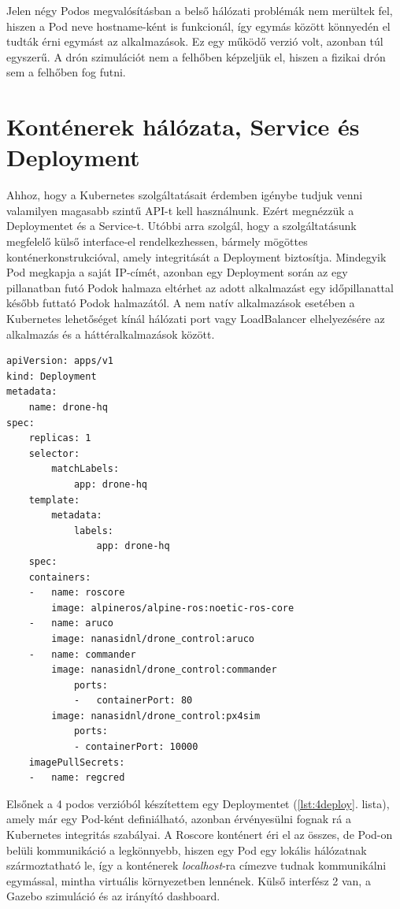 \noindent
Jelen négy Podos megvalósításban a belső hálózati problémák nem merültek fel, hiszen a Pod neve hostname-ként is funkcionál, így egymás között könnyedén el tudták érni egymást az alkalmazások. Ez egy működő verzió volt, azonban túl egyszerű. A drón szimulációt nem a felhőben képzeljük el, hiszen a fizikai drón sem a felhőben fog futni.

\section{Konténerek hálózata, Service és Deployment}

Ahhoz, hogy a Kubernetes szolgáltatásait érdemben igénybe tudjuk venni valamilyen magasabb szintű API-t kell használnunk. Ezért megnézzük a Deploymentet és a Service-t. Utóbbi arra szolgál, hogy a szolgáltatásunk megfelelő külső interface-el rendelkezhessen, bármely mögöttes konténerkonstrukcióval, amely integritását a Deployment biztosítja. Mindegyik Pod megkapja a saját IP-címét, azonban egy Deployment során az egy pillanatban futó Podok halmaza eltérhet az adott alkalmazást egy időpillanattal később futtató Podok halmazától. A nem natív alkalmazások esetében a Kubernetes lehetőséget kínál hálózati port vagy LoadBalancer elhelyezésére az alkalmazás és a háttéralkalmazások között. \cite{kservice} \\

\begin{minipage}{\linewidth}
\begin{lstlisting}[caption={Példa 4 konténeres deployment megoldásra},label={lst:4deploy}]
apiVersion: apps/v1
kind: Deployment
metadata:
	name: drone-hq
spec:
	replicas: 1
	selector:
		matchLabels:
			app: drone-hq
	template:
		metadata:
			labels:
				app: drone-hq
	spec:
	containers:
	-	name: roscore
		image: alpineros/alpine-ros:noetic-ros-core 
	-	name: aruco
		image: nanasidnl/drone_control:aruco
	- 	name: commander
		image: nanasidnl/drone_control:commander
			ports: 
			-	containerPort: 80
		image: nanasidnl/drone_control:px4sim
			ports: 
			- containerPort: 10000
	imagePullSecrets:
	-	name: regcred
\end{lstlisting}
\end{minipage}

\noindent
Elsőnek a 4 podos verzióból készítettem egy Deploymentet (\ref{lst:4deploy}. lista), amely már egy Pod-ként definiálható, azonban érvényesülni fognak rá a Kubernetes integritás szabályai. A Roscore konténert éri el az összes, de Pod-on belüli kommunikáció a legkönnyebb, hiszen egy Pod egy lokális hálózatnak szármoztatható le, így a konténerek \emph{localhost}-ra címezve tudnak kommunikálni egymással, mintha virtuális környezetben lennének. Külső interfész 2 van, a Gazebo szimuláció és az irányító dashboard. \\

